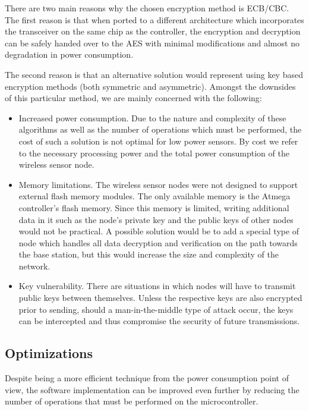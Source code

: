 There are two main reasons why the chosen encryption method is ECB/CBC. The first 
reason is that when ported to a different architecture which incorporates the 
transceiver on the same chip as the controller, the encryption and decryption can be safely 
handed over to the AES with minimal modifications and almost no degradation in 
power consumption.

The second reason is that an alternative solution would represent using key based 
encryption methods (both symmetric and asymmetric). Amongst the downsides of this 
particular method, we are mainly concerned with the following:

\begin{itemize}

\item Increased power consumption. Due to the nature and complexity of these algorithms 
as well as the number of operations which must be performed, the cost of such a 
solution is not optimal for low power sensors. By cost we refer to the necessary 
processing power and the total power consumption of the wireless sensor node.
\item Memory limitations. The wireless sensor nodes were not designed to support 
external flash memory modules. The only available memory is the Atmega controller's 
flash memory. Since this memory is limited, writing additional data in it such as 
the node's private key and the public keys of other nodes would not be practical.
A possible solution would be to add a special type of node which handles all data 
decryption and verification on the path towards the base station, but this would 
increase the size and complexity of the network.
\item Key vulnerability. There are situations in which nodes will have to transmit 
public keys between themselves. Unless the respective keys are also encrypted prior 
to sending, should a man-in-the-middle type of attack occur, the keys can be intercepted 
and thus compromise the security of future transmissions.

\end{itemize}

\subsection{Optimizations}

Despite being a more efficient technique from the power consumption point of view, the 
software implementation can be improved even further by reducing the number of operations 
that must be performed on the microcontroller.

